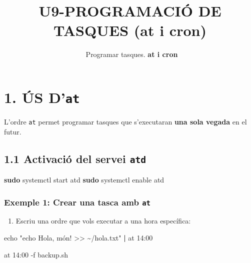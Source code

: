 \documentclass[
  12 pt,
  a4paper,
]{article}
\title{U9-PROGRAMACIÓ DE TASQUES (at i cron)}
\subtitle{~Programar tasques. \textbf{at i cron}}
\author{}
\date{\vspace{-2.5em}}
\newenvironment{Shaded}{\begin{snugshade}}{\end{snugshade}}
\newcommand{\AttributeTok}[1]{\textcolor[rgb]{0.13,0.29,0.53}{#1}}
\newcommand{\BuiltInTok}[1]{#1}
\newcommand{\ExtensionTok}[1]{#1}
\newcommand{\FunctionTok}[1]{\textcolor[rgb]{0.13,0.29,0.53}{\textbf{#1}}}
\newcommand{\KeywordTok}[1]{\textcolor[rgb]{0.13,0.29,0.53}{\textbf{#1}}}
\newcommand{\NormalTok}[1]{#1}
\newcommand{\StringTok}[1]{\textcolor[rgb]{0.31,0.60,0.02}{#1}}
\providecommand{\tightlist}{%
  \setlength{\itemsep}{0pt}\setlength{\parskip}{0pt}}
\begin{document}
\maketitle

\section{\texorpdfstring{1. ÚS
D'\texttt{at}}{1. ÚS D'at}}\label{uxfas-dat}

L'ordre \texttt{at} permet programar tasques que s'executaran
\textbf{una sola vegada} en el futur.

\subsection{\texorpdfstring{1.1 Activació del servei
\texttt{atd}}{1.1 Activació del servei atd}}\label{activaciuxf3-del-servei-atd}

\begin{Shaded}
\begin{Highlighting}[]
\FunctionTok{sudo}\NormalTok{ systemctl start atd}
\FunctionTok{sudo}\NormalTok{ systemctl enable atd}
\end{Highlighting}
\end{Shaded}

\subsubsection{\texorpdfstring{Exemple 1: Crear una tasca amb
\texttt{at}}{Exemple 1: Crear una tasca amb at}}\label{exemple-1-crear-una-tasca-amb-at}

\begin{enumerate}
\def\labelenumi{\arabic{enumi}.}
\tightlist
\item
  Escriu una ordre que vols executar a una hora específica:
\end{enumerate}

\begin{Shaded}
\begin{Highlighting}[]
\BuiltInTok{echo} \StringTok{"echo \textquotesingle{}Hola, món!\textquotesingle{} \textgreater{}\textgreater{} \textasciitilde{}/hola.txt"} \KeywordTok{|} \ExtensionTok{at}\NormalTok{ 14:00}
\end{Highlighting}
\end{Shaded}

\begin{Shaded}
\begin{Highlighting}[]
\ExtensionTok{at}\NormalTok{ 14:00 }\AttributeTok{{-}f}\NormalTok{ backup.sh}
\end{Highlighting}
\end{Shaded}
\end{document}
